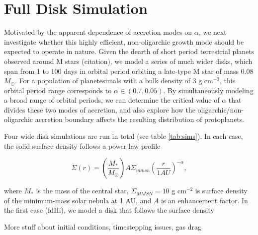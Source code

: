 \documentclass[twocolumn]{aastex63}
\begin{document}
\section{Full Disk Simulation}\label{sec:fulldisk}

Motivated by the apparent dependence of accretion modes on $\alpha$, we next investigate whether this highly efficient, non-oligarchic growth mode should be expected to operate in nature. Given the dearth of short period terrestrial planets observed around M stars (citation), we model a series of much wider disks, which span from 1 to 100 days in orbital period orbiting a late-type M star of mass 0.08 $M_{\odot}$. For a population of planetesimals with a bulk density of 3 g cm$^{-3}$, this orbital period range corresponds to $\alpha \in (0.7, 0.05)$. By simultaneously modeling a broad range of orbital periods, we can determine the critical value of $\alpha$ that divides these two modes of accretion, and also explore how the oligarchic/non-oligarchic accretion boundary affects the resulting distribution of protoplanets.

Four wide disk simulations are run in total (see table \ref{tab:sims}). In each case, the solid surface density follows a power law profile

\begin{equation}
	\Sigma(r) = \left( \frac{M_{*}}{M_{\odot}} \right) A \Sigma_{mmsn} \left( \frac{r}{1 AU} \right)^{-\alpha},
\end{equation}

\noindent where $M_{*}$ is the mass of the central star, $\Sigma_{MMSN} = 10$ g cm$^{-2}$ is surface density of the minimum-mass solar nebula \citep{hayashi81} at 1 AU, and $A$ is an enhancement factor. In the first case (fdHi), we model a disk that follows the surface density 

More stuff about initial conditions, timestepping issues, gas drag
\end{document}
